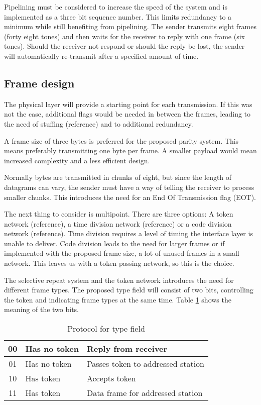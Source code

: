 Pipelining \cite[p. 323]{KOM}must be considered to increase the speed of the
system and is implemented as a three bit sequence number. This limits redundancy to a minimum
while still benefiting from pipelining. The sender transmits eight frames
(forty eight tones) and then waits for the receiver to reply with one frame
(six tones). Should the receiver not respond or should the reply be lost, the
sender will automatically re-transmit after a specified amount of time.

\subsection{Frame design}\label{dll_frame_design}
The physical layer will provide a starting point for each
transmission. If this was not the case,
additional flags would be needed in between the frames, leading to the
need of stuffing (reference) and to additional redundancy.

A frame size of three bytes is preferred for the proposed parity system. This
means preferably transmitting one byte per frame. A smaller payload would mean
increased complexity and a less efficient design.

Normally bytes are transmitted in chunks of eight, but since the length of
datagrams can vary, the sender must have a way of telling the receiver to process smaller
chunks. This introduces the need for an End Of Transmission flag (EOT).

The next thing to consider is multipoint. There are three options: A token
network (reference), a time division network (reference) or a code division
network (reference). Time division requires a level of timing the interface layer
is unable to deliver. Code division leads to the need for larger frames or if implemented with the
proposed frame size, a lot of unused frames in a small network. This leaves us
with a token passing network, so this is the choice.

The selective repeat system and the token network introduces the need for
different frame types. The proposed type field will consist of two bits, controlling the token and indicating frame types at the same time. Table \ref{tab:protocol_for_type_field} shows the meaning of the two bits.

\begin{table}[htb]
	\centering
	\begin{tabular}{|c|ll|}
		\hline
		00 & Has no token & Reply from receiver \\
		\hline
		01 & Has no token & Passes token to addressed station \\
		\hline
		10 & Has token & Accepts token \\
		\hline
		11 & Has token & Data frame for addressed station \\
		\hline
	\end{tabular}
	\caption{Protocol for type field}
	\label{tab:protocol_for_type_field}
\end{table}

